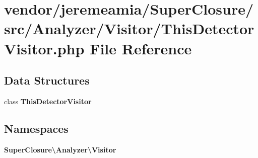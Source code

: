 \section{vendor/jeremeamia/\+Super\+Closure/src/\+Analyzer/\+Visitor/\+This\+Detector\+Visitor.php File Reference}
\label{_this_detector_visitor_8php}
\subsection*{Data Structures}
\begin{DoxyCompactItemize}
\item 
class {\bf This\+Detector\+Visitor}
\end{DoxyCompactItemize}
\subsection*{Namespaces}
\begin{DoxyCompactItemize}
\item 
 {\bf Super\+Closure\textbackslash{}\+Analyzer\textbackslash{}\+Visitor}
\end{DoxyCompactItemize}
